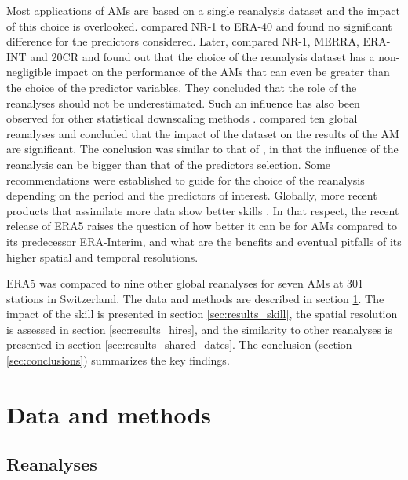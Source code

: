 \documentclass[alpha-refs]{wiley-article}
\begin{document}
Most applications of AMs are based on a single reanalysis dataset and the impact of this choice is overlooked. \citet{BenDaoud2009} compared NR-1 to ERA-40 and found no significant difference for the predictors considered. Later, \citet{Dayon2015} compared NR-1, MERRA, ERA-INT and 20CR and found out that the choice of the reanalysis dataset has a non-negligible impact on the performance of the AMs that can even be greater than the choice of the predictor variables. They concluded that the role of the reanalyses should not be underestimated. Such an influence has also been observed for other statistical downscaling methods \citep[e.g.][]{Koukidis2009}. \citet{Horton2018b} compared ten global reanalyses and concluded that the impact of the dataset on the results of the AM are significant. The conclusion was similar to that of \citet{Dayon2015}, in that the influence of the reanalysis can be bigger than that of the predictors selection. Some recommendations were established to guide for the choice of the reanalysis depending on the period and the predictors of interest. Globally, more recent products that assimilate more data show better skills \citep{Horton2018b}. In that respect, the recent release of ERA5 \citep{Hersbach2019} raises the question of how better it can be for AMs compared to its predecessor ERA-Interim, and what are the benefits and eventual pitfalls of its higher spatial and temporal resolutions.

ERA5 was compared to nine other global reanalyses for seven AMs at 301 stations in Switzerland. The data and methods are described in section \ref{sec:data_methods}. The impact of the skill is presented in section \ref{sec:results_skill}, the spatial resolution is assessed in section \ref{sec:results_hires}, and the similarity to other reanalyses is presented in section \ref{sec:results_shared_dates}. The conclusion (section \ref{sec:conclusions}) summarizes the key findings.


\section{Data and methods}
\label{sec:data_methods}

\subsection{Reanalyses}
\label{sec:reanalyses}
\end{document}
